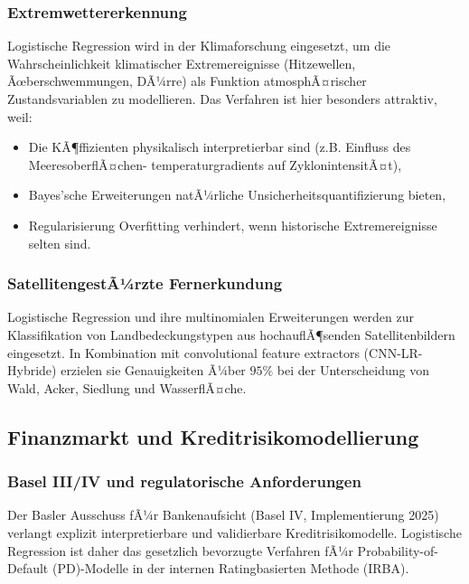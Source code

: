 ﻿\documentclass[12pt, a4paper]{article}
\theoremstyle{definition}
\theoremstyle{remark}
\begin{document}
\subsubsection{Extremwettererkennung}

Logistische Regression wird in der Klimaforschung eingesetzt, um die Wahrscheinlichkeit
klimatischer Extremereignisse (Hitzewellen, Ãœberschwemmungen, DÃ¼rre) als Funktion
atmosphÃ¤rischer Zustandsvariablen zu modellieren. Das Verfahren ist hier besonders
attraktiv, weil:
\begin{itemize}
  \item Die KÃ¶ffizienten physikalisch interpretierbar sind (z.B. Einfluss des MeeresoberflÃ¤chen-
    temperaturgradients auf ZyklonintensitÃ¤t),
  \item Bayes'sche Erweiterungen natÃ¼rliche Unsicherheitsquantifizierung bieten,
  \item Regularisierung Overfitting verhindert, wenn historische Extremereignisse selten sind.
\end{itemize}

\subsubsection{SatellitengestÃ¼rzte Fernerkundung}

Logistische Regression und ihre multinomialen Erweiterungen werden zur Klassifikation von
Landbedeckungstypen aus hochauflÃ¶senden Satellitenbildern eingesetzt. In Kombination mit
convolutional feature extractors (CNN-LR-Hybride) erzielen sie Genauigkeiten Ã¼ber $95\%$
bei der Unterscheidung von Wald, Acker, Siedlung und WasserflÃ¤che.

\subsection{Finanzmarkt und Kreditrisikomodellierung}

\subsubsection{Basel III/IV und regulatorische Anforderungen}

Der Basler Ausschuss fÃ¼r Bankenaufsicht (Basel IV, Implementierung 2025) verlangt explizit
interpretierbare und validierbare Kreditrisikomodelle. Logistische Regression ist daher das
gesetzlich bevorzugte Verfahren fÃ¼r Probability-of-Default (PD)-Modelle in der internen
Ratingbasierten Methode (IRBA).
\end{document}

